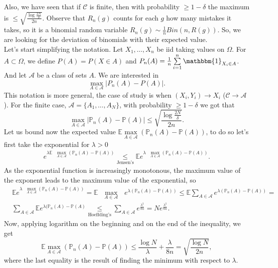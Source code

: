 \documentclass[11pt, english]{article}
\begin{document}
Also, we have seen that if $\mathcal{C}$ is finite, then with probability $\geq 1-\delta$ the maximum is $\leq \sqrt{\frac{\log\frac{2N}{\delta}}{2n}}$. Observe that $R_n(g)$ counts for each $g$ how many mistakes it takes, so it is a binomial random variable $R_n(g)\sim \frac{1}{n}Bin(n,R(g))$. So, we are looking for the deviation of binomials with their expected value.\\

Let's start simplifying the notation. Let $X_1,\dots,X_n$ be iid taking values on $\Omega$. For $A\subset \Omega$, we define $P(A)=P(X\in A)$ and $P_n(A)=\frac{1}{n}\sum\limits_{i=1}^n\mathbbm{1}_{X_i\in A}$. And let $\mathcal{A}$ be a class of sets $A$. We are interested in 
\begin{equation}
	\underset{A\in\mathcal{A}}{\max}|P_n(A)-P(A)|.
\end{equation}
This notation is more general, the case of study is when $(X_i,Y_i)\rightarrow X_i$ ($\mathcal{C}\rightarrow \mathcal{A}$). For the finite case, $\mathcal{A}=\{A_1,\dots,A_N\}$, with probability $\geq 1-\delta$ we got that 
\begin{equation}
	\underset{A\in\mathcal{A}}{\max}|\mathbb{P}_n(A)-\mathbb{P}(A)|\leq\sqrt{\frac{\log\frac{2N}{\delta}}{2n}}.
\end{equation}
Let us bound now the expected value $\mathbb{E}\underset{A\in\mathcal{A}}{\max}(\mathbb{P}_n(A)-\mathbb{P}(A))$, to do so let's first take the exponential for $\lambda>0$
\begin{align}
	e^{\lambda\mathbb{E}\text{ }\underset{A\in\mathcal{A}}{\max}(\mathbb{P}_n(A)-\mathbb{P}(A))}\underset{\text{Jensen's}}{\leq}\mathbb{E}e^{\lambda\text{ }\underset{A\in\mathcal{A}}{\max}(\mathbb{P}_n(A)-\mathbb{P}(A))}.
\end{align}
As the exponential function is increasingly monotonous, the maximum value of the exponent leads to the maximum value of the exponential, so 
\begin{align}
	&\mathbb{E}e^{\lambda\text{ }\underset{A\in\mathcal{A}}{\max}(\mathbb{P}_n(A)-\mathbb{P}(A))}=\mathbb{E}\text{ }\underset{A\in\mathcal{A}}{\max}\text{ }e^{\lambda(\mathbb{P}_n(A)-\mathbb{P}(A))}\leq\mathbb{E}\sum\limits_{A\in\mathcal{A}}e^{\lambda(\mathbb{P}_n(A)-\mathbb{P}(A))}=\\
	&\sum\limits_{A\in\mathcal{A}}\mathbb{E}e^{\lambda(\mathbb{P}_n(A)-\mathbb{P}(A)}\underset{\text{Hoeffding's}}{\leq}\sum\limits_{A\in\mathcal{A}}e^{\frac{\lambda^2}{8n}}=Ne^{\frac{\lambda^2}{8n}}.
\end{align}
Now, applying logarithm on the beginning and on the end of the inequality, we get
\begin{equation}
	\mathbb{E}\underset{A\in\mathcal{A}}{\max}(\mathbb{P}_n(A)-\mathbb{P}(A))\leq\frac{\log N}{\lambda}+\frac{\lambda}{8n}=\sqrt{\frac{\log N}{2n}},
\end{equation}
where the last equality is the result of finding the minimum with respect to $\lambda$.\\
\end{document}
